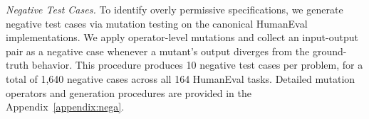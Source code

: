 \textit{Negative Test Cases.}
\label{sec:neg-cases}
To identify overly permissive specifications, we generate negative test cases via mutation testing on the canonical HumanEval implementations. We apply operator-level mutations and collect an input-output pair as a negative case whenever a mutant’s output diverges from the ground-truth behavior. This procedure produces 10 negative test cases per problem, for a total of 1{,}640 negative cases across all 164 HumanEval tasks. Detailed mutation operators and generation procedures are provided in the Appendix~\ref{appendix:nega}.







